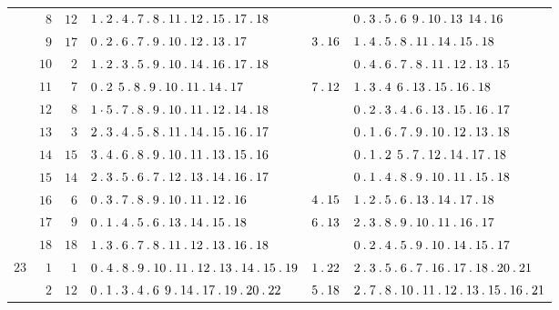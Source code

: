 \begin{longtable}{r|r|r|p{125pt}|p{28pt}|p{125pt}}
 & $8$ & $12$ & $1\pdot 2\pdot 4\pdot 7\pdot 8\pdot 11\pdot 12\pdot 15\pdot 17\pdot 18$ &  & $0\pdot 3\pdot 5\pdot 6\mspace{8mu}9\pdot 10\pdot 13\mspace{8mu}14\pdot 16$\\
 & $9$ & $17$ & $0\pdot 2\pdot 6\pdot 7\pdot 9\pdot 10\pdot 12\pdot 13\pdot 17$ & $3\pdot 16$ & $1\pdot 4\pdot 5\pdot 8\pdot 11\pdot 14\pdot 15\pdot 18$\\
 & $10$ & $2$ & $1\pdot 2\pdot 3\pdot 5\pdot 9\pdot 10\pdot 14\pdot 16\pdot 17\pdot 18$ &  & $0\pdot 4\pdot 6\pdot 7\pdot 8\pdot 11\pdot 12\pdot 13\pdot 15$\\
 & $11$ & $7$ & $0\pdot 2\mspace{8mu}5\pdot 8\pdot 9\pdot 10\pdot 11\pdot 14\pdot 17$ & $7\pdot 12$ & $1\pdot 3\pdot 4\mspace{8mu}6\pdot 13\pdot 15\pdot 16\pdot 18$\\
 & $12$ & $8$ & $1\mathbin{\raisebox{.4ex}{.}} 5\pdot 7\pdot 8\pdot 9\pdot 10\pdot 11\pdot 12\pdot 14\pdot 18$ &  & $0\pdot 2\pdot 3\pdot 4\pdot 6\pdot 13\pdot 15\pdot 16\pdot 17$\\
 & $13$ & $3$ & $2\pdot 3\pdot 4\pdot 5\pdot 8\pdot 11\pdot 14\pdot 15\pdot 16\pdot 17$ &  & $0\pdot 1\pdot 6\pdot 7\pdot 9\pdot 10\pdot 12\pdot 13\pdot 18$\\
 & $14$ & $15$ & $3\pdot 4\pdot 6\pdot 8\pdot 9\pdot 10\pdot 11\pdot 13\pdot 15\pdot 16$ &  & $0\pdot 1\pdot 2\mspace{8mu}5\pdot 7\pdot 12\pdot 14\pdot 17\pdot 18$\\
 & $15$ & $14$ & $2\pdot 3\pdot 5\pdot 6\pdot 7\pdot 12\pdot 13\pdot 14\pdot 16\pdot 17$ &  & $0\pdot 1\pdot 4\pdot 8\pdot 9\pdot 10\pdot 11\pdot 15\pdot 18$\\
 & $16$ & $6$ & $0\pdot 3\pdot 7\pdot 8\pdot 9\pdot 10\pdot 11\pdot 12\pdot 16$ & $4\pdot 15$ & $1\pdot 2\pdot 5\pdot 6\pdot 13\pdot 14\pdot 17\pdot 18$\\
 & $17$ & $9$ & $0\pdot 1\pdot 4\pdot 5\pdot 6\pdot 13\pdot 14\pdot 15\pdot 18$ & $6\pdot 13$ & $2\pdot 3\pdot 8\pdot 9\pdot 10\pdot 11\pdot 16\pdot 17$\\
 & $18$ & $18$ & $1\pdot 3\pdot 6\pdot 7\pdot 8\pdot 11\pdot 12\pdot 13\pdot 16\pdot 18$ &  & $0\pdot 2\pdot 4\pdot 5\pdot 9\pdot 10\pdot 14\pdot 15\pdot 17$\\
$23$ & $1$ & $1$ & $0\pdot 4\pdot 8\pdot 9\pdot 10\pdot 11\pdot 12\pdot 13\pdot 14\pdot 15\pdot 19$ & $1\pdot 22$ & $2\pdot 3\pdot 5\pdot 6\pdot 7\pdot 16\pdot 17\pdot 18\pdot 20\pdot 21$\\
 & $2$ & $12$ & $0\pdot 1\pdot 3\pdot 4\pdot 6\mspace{8mu}9\pdot 14\pdot 17\pdot 19\pdot 20\pdot 22$ & $5\pdot 18$ & $2\pdot 7\pdot 8\pdot 10\pdot 11\pdot 12\pdot 13\pdot 15\pdot 16\pdot 21$\\

\end{longtable}
